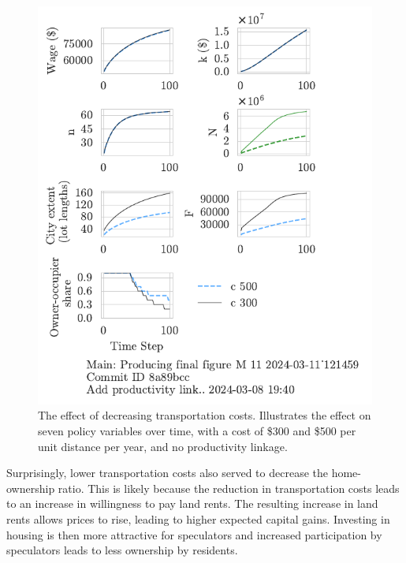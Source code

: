 
\begin{figure}[h!b]
\centering
\includegraphics[scale=0.9, trim={0 1.4cm 0 0},clip]{fig/c-Main-121459.pdf}
\caption[The effect of decreasing transportation costs]{The effect of decreasing transportation costs. Illustrates the effect on seven policy variables over time, with a cost of \$300 and \$500 per unit distance per year, and no productivity linkage.}
\label{fig:c_ownership_trajectory}
\end{figure}


Surprisingly, lower transportation costs also served to decrease the home-ownership ratio. This is likely because the reduction in transportation costs leads to an increase in willingness to pay land rents. The resulting increase in land rents allows prices to rise, leading to higher expected capital gains.  Investing in housing is then more attractive for speculators and increased participation by speculators leads to less ownership by residents. 

